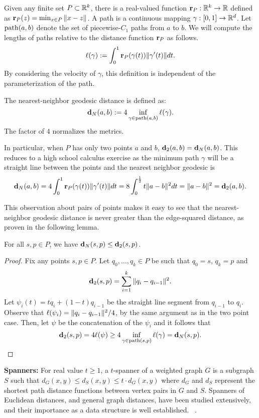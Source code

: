   Given any finite set $P\subset \mathbb{R}^k$, there is a real-valued function $\mathbf{r}_P: \mathbb{R}^k\to \mathbb{R}$ defined as $\mathbf{r}_P(z) = \min_{x\in P} \|x-z\|$.
  A path is a continuous mapping $\gamma:[0,1]\to \mathbb{R}^d$.
  Let $\mathrm{path}(a,b)$ denote the set of piecewise-$C_1$ paths from $a$ to $b$.
  We will compute the lengths of paths relative to the distance function $\mathbf{r}_P$ as follows.
  \[
    \ell(\gamma) := \int_0^1 \mathbf{r}_P(\gamma(t))\|\gamma'(t)\|dt.
  \]
  By considering the velocity of $\gamma$, this definition is
  independent of the parameterization of the path.
  \begin{definition}
    The nearest-neighbor geodesic distance is defined as:
  \[
    \mathbf{d}_N(a,b) := 4 \inf_{\gamma\in \mathrm{path}(a,b)}\ell(\gamma).
  \]
  The factor of $4$ normalizes the metrics.
  \end{definition}
  In particular, when $P$ has only two points $a$ and $b$, $\mathbf{d}_2(a,b) = \mathbf{d}_N(a,b)$.
  This reduces to a high school calculus exercise as the minimum path
  $\gamma$ will be a straight line between the points and the nearest
  neighbor geodesic is
  \[
    \mathbf{d}_N(a,b) = 4\int_0^1 \mathbf{r}_P(\gamma(t))\|\gamma'(t)\|dt = 8\int_0^{\frac{1}{2}} t \|a - b\|^2 dt = \|a - b\|^2 = \mathbf{d}_2(a,b).
  \]

  This observation about pairs of points makes it easy to see that the
  nearest-neighbor geodesic distance is never greater than the
  edge-squared distance, as proven in the following lemma.

  \begin{lemma}\label{lem:dist_N_le_dist}
    For all $s,p\in P$, we have $\mathbf{d}_N(s,p)\le \mathbf{d}_2(s,p)$.
  \end{lemma}
  \begin{proof}
    Fix any points $s,p\in P$.
    Let $q_0,\ldots, q_k \in P$ be such that $q_0 = s$, $q_k = p$ and
    \[
      \mathbf{d}_2(s,p) = \sum_{i=1}^k \|q_i - q_{i-1}\|^2.
    \]
    Let $\psi_i(t) = tq_i + (1-t)q_{i-1}$ be the straight line segment from $q_{i-1}$ to $q_i$.
    Observe that $\ell(\psi_i) = \|q_i - q_{i-1}\|^2 / 4$, by the same argument as in the two point case.
    Then, let $\psi$ be the concatenation of the $\psi_i$ and it follows that
    \[
      \mathbf{d}_2(s,p) = 4 \ell(\psi) \ge 4 \inf_{\gamma\in \mathrm{path}(s,p)} \ell(\gamma) = \mathbf{d}_N(s,p).\qedhere
    \]
  \end{proof}

\vspace{3 mm}
  
\noindent \textbf{Spanners:} For real value $t \geq 1$, a $t$-spanner of
a weighted graph $G$ is a subgraph $S$ such that $d_G(x,y) \leq d_S(x,y)
\leq t\cdot d_G(x,y)$ where $d_G$ and $d_S$ represent the shortest path
distance functions between vertex pairs in $G$ and $S$. Spanners
of Euclidean distances, and general graph distances, have been
studied extensively, and their importance as a data structure is
well established.
~\cite{Chew1986, Vaidya1991, Callahan1993,HarPeled13}.

